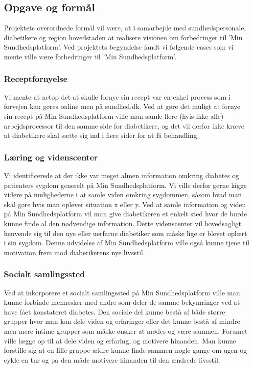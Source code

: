 \subsection{Opgave og formål}
Projektets overordnede formål vil være, at i samarbejde med sundhedspersonale, diabetikere og region hovedstaden at realisere visionen om forbedringer til 'Min Sundhedsplatform'. Ved projektets begyndelse fandt vi følgende cases som vi mente ville være forbedringer til 'Min Sundhedsplatform'.
\subsubsection{Receptfornyelse}
Vi mente at netop det at skulle fornye sin recept var en enkel process som i forvejen kan gøres online men på sundhed.dk. Ved at gøre det muligt at fornye sin recept på Min Sundhedsplatform ville man samle flere (hvis ikke alle) arbejdsprocessor til den samme side for diabetikere, og det vil derfor ikke kræve at diabetikere skal sætte sig ind i flere sider for at få behandling.
\subsubsection{Læring og videnscenter}
Vi identificerede at der ikke var meget almen information omkring diabetes og patienters sygdom generelt på Min Sundhedsplatform. Vi ville derfor gerne kigge videre på mulighederne i at samle viden omkring sygdommen, såsom hvad man skal gøre hvis man oplever situation x eller y. Ved at samle information og viden på Min Sundhedsplatform vil man give diabetikeren et enkelt sted hvor de burde kunne finde al den nødvendige information. Dette videnscenter vil hovedsagligt henvende sig til den nye eller uerfarne diabetiker som måske lige er blevet oplært i sin sygdom. Denne udvidelse af Min Sundhedsplatform ville også kunne tjene til motivation frem mod diabetikerens nye livsstil.
\subsubsection{Socialt samlingssted}
Ved at inkorporere et socialt samlingssted på Min Sundhedsplatform ville man kunne forbinde mennesker med andre som deler de samme bekymringer ved at have fået konstateret diabetes. Den sociale del kunne bestå af både større grupper hvor man kan dele viden og erfaringer eller det kunne bestå af mindre men mere intime grupper som måske ønsker at mødes og være sammen. Forumet ville lægge op til at dele viden og erfaring, og motivere hinanden. Man kunne forstille sig at en lille gruppe ældre kunne finde sammen nogle gange om ugen og cykle en tur og på den måde motivere hinanden til den ændrede livsstil.
